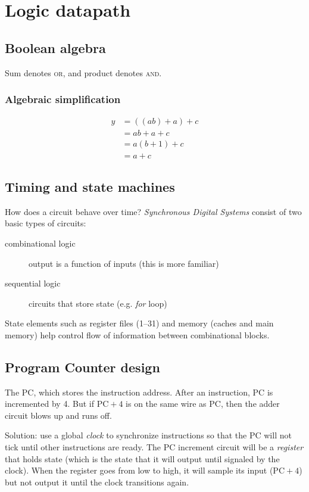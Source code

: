 \chapter{Logic datapath}
\section{Boolean algebra}
Sum denotes \textsc{or}, and product denotes \textsc{and}.
\subsection{Algebraic simplification}
\begin{align}
y &= \left(\left(ab\right) + a\right) + c\\
&= ab + a + c\\
&= a\left(b + 1\right) + c\\
&= a + c
\end{align}
\section{Timing and state machines}
How does a circuit behave over time?
\emph{Synchronous Digital Systems} consist of two basic types of circuits:
\begin{description}
	\item[combinational logic] output is a function of inputs (this is more familiar)
	\item[sequential logic] circuits that store state (e.g. \emph{for} loop)
\end{description}

State elements such as register files (1--31) and memory (caches and main memory) help control flow of information between combinational blocks.
\section{Program Counter design}
The PC, which stores the instruction address.
After an instruction, PC is incremented by 4.
But if \(\text{PC} + 4\) is on the same wire as  \(\text{PC}\),
then the adder circuit blows up and runs off.

Solution: use a global \emph{clock} to synchronize instructions
so that the PC will not tick until other instructions are ready.
The PC increment circuit will be a \emph{register} that holds state
(which is the state that it will output until signaled by the clock).
When the register goes from low to high, it will sample its input (\(\text{PC}+4\)) but not output it until the clock transitions again.


